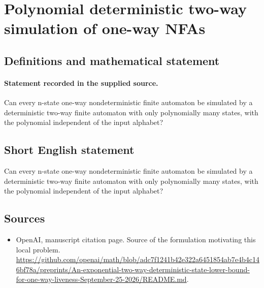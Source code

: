 \documentclass[11pt]{article}
\begin{document}
\section*{Polynomial deterministic two-way simulation of one-way NFAs}\label{30007470}
\subsection{Definitions and mathematical statement}
\paragraph{Statement recorded in the supplied source.}
Can every n-state one-way nondeterministic finite automaton be simulated by a deterministic two-way finite automaton with only polynomially many states, with the polynomial independent of the input alphabet?
\subsection{Short English statement}
Can every n-state one-way nondeterministic finite automaton be simulated by a deterministic two-way finite automaton with only polynomially many states, with the polynomial independent of the input alphabet?
\subsection{Sources}
\begin{itemize}
\item[S1] OpenAI, manuscript citation page. Source of the formulation motivating this local problem.
\url{https://github.com/openai/math/blob/adc7f1241b42e322a6451854ab7e4b4c146bf78a/preprints/An-exponential-two-way-deterministic-state-lower-bound-for-one-way-liveness-September-25-2026/README.md}.
\end{itemize}
\end{document}
